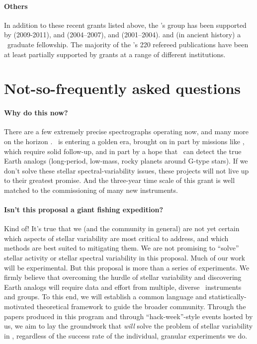 \documentclass[12pt, letterpaper]{article}
\begin{document}
\paragraph{Others}
In addition to these recent grants listed above, the \PI's group has been supported by
 (2009-2011),
and
 (2004--2007),
and
 (2001--2004).
and (in ancient history) a \NSF\ graduate fellowship.
The majority of the \PI's 220 refereed publications have been at least partially supported
by \NSF grants at a range of different institutions.

\section{Not-so-frequently asked questions}

\paragraph{Why do this now?}
There are a few extremely precise spectrographs operating now, 
and many more on the horizon \citep{Wright2017}.
\EPRV\ is entering a golden era, brought on in part by missions like
\TESS, which require solid follow-up, and in part by a hope that
\EPRV\ can detect the true Earth analogs (long-period, low-mass, rocky
planets around G-type stars).
If we don't solve these stellar spectral-variability issues, these
projects will not live up to their greatest promise.
And the three-year time scale of this grant is well matched to the
commissioning of many new instruments.

\paragraph{Isn't this proposal a giant fishing expedition?}
Kind of! It's true that we (and the community in general) are not yet certain 
which aspects of stellar variability are most critical to address, and which 
methods are best suited to mitigating them. We are not promising to 
``solve'' stellar activity or stellar spectral variability in this proposal.
Much of our work will be 
experimental. But this proposal is more than a series of experiments. 
We firmly believe that overcoming the hurdle of stellar variability and 
discovering Earth analogs will require data and effort from multiple, 
diverse \EPRV\ instruments and groups. To this end, we will establish 
a common language and statistically-motivated theoretical framework 
to guide the broader community. Through the papers produced in this 
program and through ``hack-week''-style events hosted by us, we aim to 
lay the groundwork that \textit{will} solve the problem of stellar variability 
in \EPRV, regardless of the success rate of the individual, granular experiments we do. 
\end{document}
